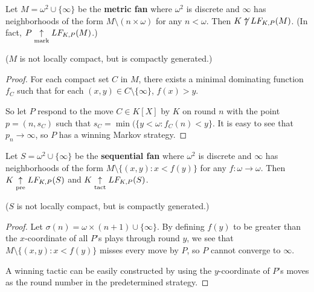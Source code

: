 \begin{ex}
Let $M = \omega^2 \cup \{\infty\}$ be the \textbf{metric fan} where $\omega^2$ is discrete and $\infty$ has neighborhoods of the form $M \setminus (n\times\omega)$ for any $n<\omega$. Then $K \not\uparrow LF_{K,P}(M)$. (In fact, $P \underset{\text{mark}}{\uparrow} LF_{K,P}(M)$.)

($M$ is not locally compact, but is compactly generated.)
\end{ex}

\begin{proof}
For each compact set $C$ in $M$, there exists a minimal dominating function $f_C$ such that for each $(x,y)\in C\setminus\{\infty\}$, $f(x)> y$.

So let $P$ respond to the move $C\in K[X]$ by $K$ on round $n$ with the point $p=(n,s_C)$ such that $s_C = \min(\{y<\omega : f_C(n) < y\}$. It is easy to see that $p_n\rightarrow \infty$, so $P$ has a winning Markov strategy.
\end{proof}

\begin{ex}
Let $S = \omega^2 \cup \{\infty\}$ be the \textbf{sequential fan} where $\omega^2$ is discrete and $\infty$ has neighborhoods of the form $M \setminus \{(x,y) : x<f(y)\}$ for any $f:\omega\to\omega$. Then $K \underset{\text{pre}}{\uparrow} LF_{K,P}(S)$ and $K\underset{\text{tact}}{\uparrow} LF_{K,P}(S)$.

($S$ is not locally compact, but is compactly generated.)


\end{ex}

\begin{proof}
Let $\sigma(n)=\omega\times(n+1) \cup \{\infty\}$. By defining $f(y)$ to be greater than the $x$-coordinate of all $P$'s plays through round $y$, we see that $M\setminus\{(x,y): x<f(y)\}$ misses every move by $P$, so $P$ cannot converge to $\infty$.

A winning tactic can be easily constructed by using the $y$-coordinate of $P$'s moves as the round number in the predetermined strategy.
\end{proof}
